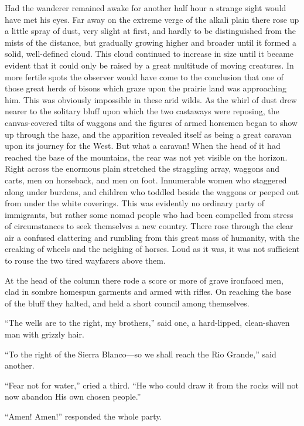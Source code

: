 \documentclass[12pt]{book}
\begin{document}
Had the wanderer remained awake for another half hour a strange sight would have met his eyes. Far away on the extreme verge of the alkali plain there rose up a little spray of dust, very slight at first, and hardly to be distinguished from the mists of the distance, but gradually growing higher and broader until it formed a solid, well-defined cloud. This cloud continued to increase in size until it became evident that it could only be raised by a great multitude of moving creatures. In more fertile spots the observer would have come to the conclusion that one of those great herds of bisons which graze upon the prairie land was approaching him. This was obviously impossible in these arid wilds. As the whirl of dust drew nearer to the solitary bluff upon which the two castaways were reposing, the canvas-covered tilts of waggons and the figures of armed horsemen began to show up through the haze, and the apparition revealed itself as being a great caravan upon its journey for the West. But what a caravan! When the head of it had reached the base of the mountains, the rear was not yet visible on the horizon. Right across the enormous plain stretched the straggling array, waggons and carts, men on horseback, and men on foot. Innumerable women who staggered along under burdens, and children who toddled beside the waggons or peeped out from under the white coverings. This was evidently no ordinary party of immigrants, but rather some nomad people who had been compelled from stress of circumstances to seek themselves a new country. There rose through the clear air a confused clattering and rumbling from this great mass of humanity, with the creaking of wheels and the neighing of horses. Loud as it was, it was not sufficient to rouse the two tired wayfarers above them. 

At the head of the column there rode a score or more of grave ironfaced men, clad in sombre homespun garments and armed with rifles. On reaching the base of the bluff they halted, and held a short council among themselves. 

“The wells are to the right, my brothers,” said one, a hard-lipped, clean-shaven man with grizzly hair. 

“To the right of the Sierra Blanco—so we shall reach the Rio Grande,” said another. 

“Fear not for water,” cried a third. “He who could draw it from the rocks will not now abandon His own chosen people.” 

“Amen! Amen!” responded the whole party. 
\end{document}
